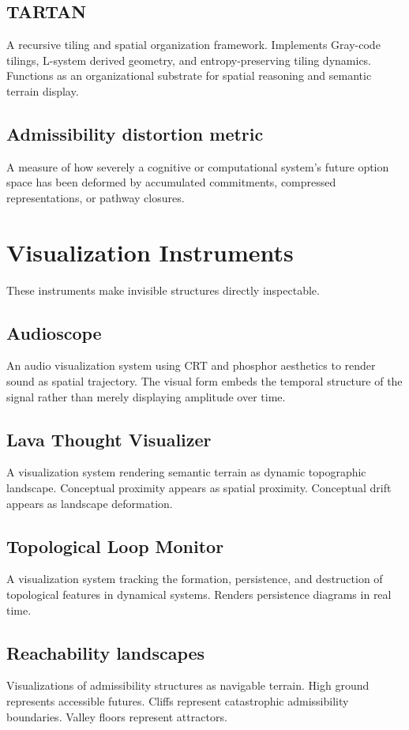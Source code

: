 \documentclass[12pt, openany]{book}
\begin{document}
\subsection{TARTAN} A recursive tiling and spatial organization framework.
Implements Gray-code tilings, L-system derived geometry, and
entropy-preserving tiling dynamics. Functions as an organizational substrate
for spatial reasoning and semantic terrain display.

\subsection{Admissibility distortion metric} A measure of how severely a
cognitive or computational system's future option space has been deformed
by accumulated commitments, compressed representations, or pathway closures.

\section{Visualization Instruments}

These instruments make invisible structures directly inspectable.

\subsection{Audioscope} An audio visualization system using CRT and phosphor
aesthetics to render sound as spatial trajectory. The visual form embeds
the temporal structure of the signal rather than merely displaying amplitude
over time.

\subsection{Lava Thought Visualizer} A visualization system rendering
semantic terrain as dynamic topographic landscape. Conceptual proximity
appears as spatial proximity. Conceptual drift appears as landscape
deformation.

\subsection{Topological Loop Monitor} A visualization system tracking the
formation, persistence, and destruction of topological features in dynamical
systems. Renders persistence diagrams in real time.

\subsection{Reachability landscapes} Visualizations of admissibility
structures as navigable terrain. High ground represents accessible futures.
Cliffs represent catastrophic admissibility boundaries. Valley floors
represent attractors.
\end{document}
